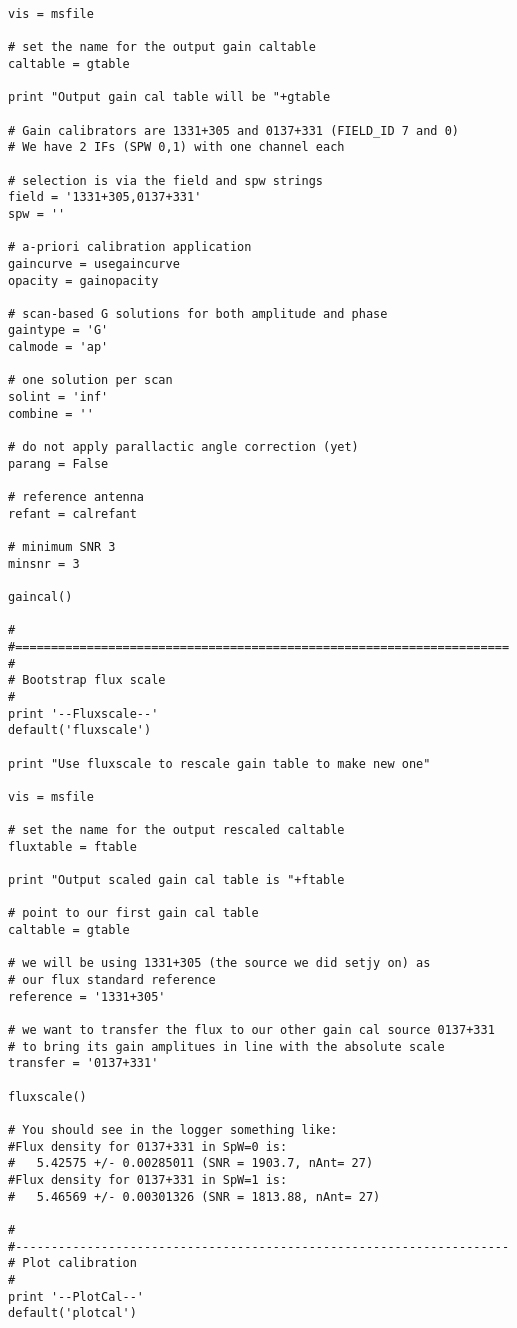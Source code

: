 \begin{verbatim}
vis = msfile

# set the name for the output gain caltable
caltable = gtable

print "Output gain cal table will be "+gtable

# Gain calibrators are 1331+305 and 0137+331 (FIELD_ID 7 and 0)
# We have 2 IFs (SPW 0,1) with one channel each

# selection is via the field and spw strings
field = '1331+305,0137+331'
spw = ''

# a-priori calibration application
gaincurve = usegaincurve
opacity = gainopacity

# scan-based G solutions for both amplitude and phase
gaintype = 'G'
calmode = 'ap'

# one solution per scan
solint = 'inf'
combine = ''

# do not apply parallactic angle correction (yet)
parang = False

# reference antenna
refant = calrefant

# minimum SNR 3
minsnr = 3

gaincal()

#
#=====================================================================
#
# Bootstrap flux scale
#
print '--Fluxscale--'
default('fluxscale')

print "Use fluxscale to rescale gain table to make new one"

vis = msfile

# set the name for the output rescaled caltable
fluxtable = ftable

print "Output scaled gain cal table is "+ftable

# point to our first gain cal table
caltable = gtable

# we will be using 1331+305 (the source we did setjy on) as
# our flux standard reference
reference = '1331+305'

# we want to transfer the flux to our other gain cal source 0137+331
# to bring its gain amplitues in line with the absolute scale
transfer = '0137+331'

fluxscale()

# You should see in the logger something like:
#Flux density for 0137+331 in SpW=0 is:
#   5.42575 +/- 0.00285011 (SNR = 1903.7, nAnt= 27)
#Flux density for 0137+331 in SpW=1 is:
#   5.46569 +/- 0.00301326 (SNR = 1813.88, nAnt= 27)

#
#---------------------------------------------------------------------
# Plot calibration
#
print '--PlotCal--'
default('plotcal')


\end{verbatim}
